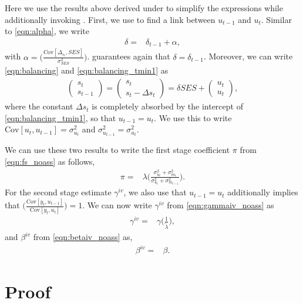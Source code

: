 Here we use the results above derived under  to simplify the expressions while additionally invoking .
%
First, we use  to find a link between $u_{t-1}$ and $u_{t}$. Similar to \eqref{eqn:alpha}, we write
\begin{align}
    \delta =& \delta_{t-1} + \alpha,
\end{align}
with $\alpha=\Bigg(\frac{\mathrm{Cov}[\Delta_{s_{t}},SES]}{\sigma_{SES}^2}\Bigg)$.  guarantees again that $\delta=\delta_{t-1}$. Moreover, we can write \eqref{eqn:balancing} and \eqref{eqn:balancing_tmin1} as
\begin{align} 
 \begin{pmatrix} s_{t} \\ s_{t-1} \end{pmatrix}= \begin{pmatrix} s_{t} \\ s_{t}-\Delta{s_{t}} \end{pmatrix}= \delta SES +  \begin{pmatrix}  u_{t}  \\ u_{t} \end{pmatrix},
\end{align} 
where the constant $\Delta{s_{t}}$ is completely absorbed by the intercept of \eqref{eqn:balancing_tmin1}, so that $u_{t-1}=u_{t}$. We use this to write $\mathrm{Cov}[u_{t},u_{t-1}]=\sigma_{u_{t}}^2$ and $\sigma_{u_{t-1}}^2=\sigma_{u_{t}}^2$.

We can use these two results to write the first stage coefficient $\pi$ from \eqref{eqn:fs_noass} as follows,
\begin{align}\label{eqn:fs_ass}
    \pi=&\lambda \Bigg( \frac{\sigma_{u_{t}}^2+\sigma_{m_{t}}^2}{\sigma_{u_{t}}^2+\sigma_{m_{t-1}}^2}\Bigg).
\end{align}
%
For the second stage estimate $\gamma^{iv}$, we also use that $u_{t-1}=u_{t}$ additionally implies that $\Bigg(\frac{\mathrm{Cov}[y_{t},u_{t-1}]}{\mathrm{Cov}[y_{t},u_{t}]}\Bigg)=1$. We can now write $\gamma^{iv}$ from \eqref{eqn:gammaiv_noass} as
\begin{align}\label{eqn:gammaiv_ass}
    \gamma^{iv}=& \gamma \Bigg(\frac{1}{\widetilde{\lambda}}\Bigg),
\end{align}
and $\beta^{iv}$ from \eqref{eqn:betaiv_noass} as,
\begin{align}\label{eqn:betaiv_ass}
    \beta^{iv}=& \beta.
\end{align}

\section{\texorpdfstring{Proof }{proof}}\label{sec:proof_fs}

